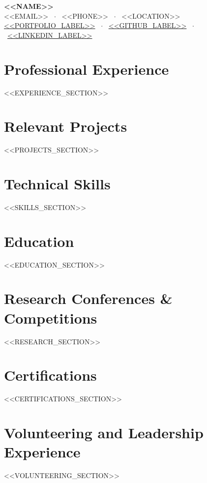 \documentclass[a4paper,10pt]{article}
\begin{document}
\begin{center}
    {\LARGE \textbf{<<NAME>>}} \\ \vspace{2pt}
    \small <<EMAIL>> \ $\cdot$ \ <<PHONE>> \ $\cdot$ \ <<LOCATION>> \\ \vspace{2pt}
    \small \href{<<PORTFOLIO>>}{<<PORTFOLIO_LABEL>>} \ $\cdot$ \ \href{<<GITHUB>>}{<<GITHUB_LABEL>>} \ $\cdot$ \ \href{<<LINKEDIN>>}{<<LINKEDIN_LABEL>>}
\end{center}

\vspace{-2pt}

\section{Professional Experience}
<<EXPERIENCE_SECTION>>

\section{Relevant Projects}
<<PROJECTS_SECTION>>

\section{Technical Skills}
<<SKILLS_SECTION>>

\section{Education}
<<EDUCATION_SECTION>>

\section{Research Conferences \& Competitions}
<<RESEARCH_SECTION>>

\section{Certifications}
<<CERTIFICATIONS_SECTION>>

\section{Volunteering and Leadership Experience}
<<VOLUNTEERING_SECTION>>
\end{document}
